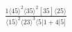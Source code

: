 \documentclass[varwidth, border=5pt]{standalone}
\begin{document}
\begin{my}
$\begin{gathered}
\scriptscriptstyle\frac{1⟨45⟩^2⟨35⟩^2[35]⟨25⟩}{⟨15⟩^2⟨23⟩^3⟨5|1+4|5]}
\end{gathered}$
\end{my}
\end{document}
